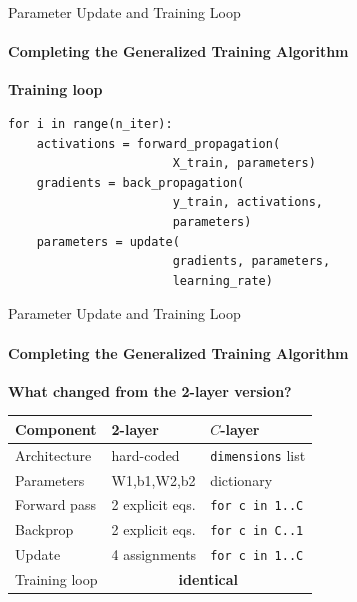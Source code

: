 \documentclass[aspectratio=169]{beamer}
\begin{document}
%
%
\begin{frame}[fragile]{Parameter Update and Training Loop}
\framesubtitle{Completing the Generalized Training Algorithm}

\textbf{\small Training loop}
\begin{lstlisting}
for i in range(n_iter):
    activations = forward_propagation(
                       X_train, parameters)
    gradients = back_propagation(
                       y_train, activations,
                       parameters)
    parameters = update(
                       gradients, parameters,
                       learning_rate)
\end{lstlisting}
\end{frame}
%
%
\begin{frame}[fragile]{Parameter Update and Training Loop}
\framesubtitle{Completing the Generalized Training Algorithm}
\textbf{\small What changed from the 2-layer version?}

\vspace{0.5cm}
{\normalsize
\renewcommand{\arraystretch}{1.05}
\begin{tabular}{@{}p{4cm}@{\;\;}p{4cm}@{\;\;}p{4cm}@{}}
\textbf{Component} & \textbf{2-layer} & \textbf{$C$-layer} \\
\hline
Architecture & hard-coded & \texttt{dimensions} list \\
Parameters & W1,b1,W2,b2 & dictionary \\
Forward pass & 2 explicit eqs. & \texttt{for c in 1..C} \\
Backprop & 2 explicit eqs. & \texttt{for c in C..1} \\
Update & 4 assignments & \texttt{for c in 1..C} \\
Training loop & \multicolumn{2}{c}{\textbf{identical}} \\
\end{tabular}
}
\end{frame}
%
%
\end{document}
